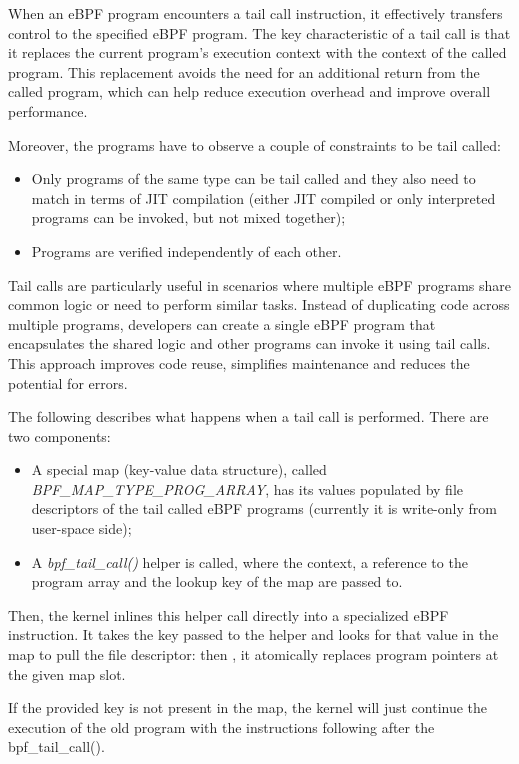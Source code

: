 When an eBPF program encounters a tail call instruction, it effectively transfers control to the specified eBPF program.
The key characteristic of a tail call is that it replaces the current program's execution context with the context of the called program. 
This replacement avoids the need for an additional return from the called program, which can help reduce execution overhead and improve overall performance.

Moreover, the programs have to observe a couple of constraints to be tail called:

\begin{itemize}
	\item Only programs of the same type can be tail called and they also need to
		match in terms of JIT compilation (either JIT compiled or only interpreted programs can be invoked, but not mixed together);
	\item Programs are verified independently of each other.
\end{itemize}

Tail calls are particularly useful in scenarios where multiple eBPF programs share common logic or need to perform similar tasks. 
Instead of duplicating code across multiple programs, developers can create a single eBPF program that encapsulates the shared logic and other programs can invoke it using tail calls. 
This approach improves code reuse, simplifies maintenance and reduces the potential for errors.

The following describes what happens when a tail call is performed. 
There are two components:

\begin{itemize}
	\item A special map (key-value data structure), called 
		\textit{BPF\_MAP\_TYPE\_PROG\_ARRAY}, has its values populated by file descriptors of the tail called eBPF programs (currently it is write-only from user-space side);
	\item A \textit{bpf\_tail\_call()} helper is called, where the context, a
		reference to the program array and the lookup key of the map are passed to. 
\end{itemize}

Then, the kernel inlines this helper call directly into a specialized eBPF instruction.
It takes the key passed to the helper and looks for that value in the map to pull the file descriptor: then , it atomically replaces program pointers at the given map slot. 

If the provided key is not present in the map, the kernel will just continue the execution of the old program with the instructions following after the bpf\_tail\_call().

